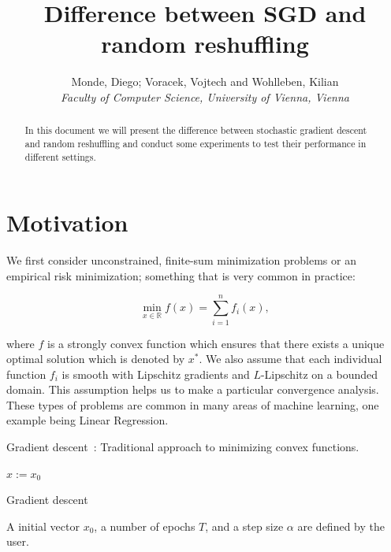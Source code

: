 \documentclass[10pt,conference,compsocconf]{IEEEtran}
\begin{document}
\title{Difference between SGD and random reshuffling}

\author{
  Monde, Diego; Voracek, Vojtech and Wohlleben, Kilian\\
  \textit{Faculty of Computer Science, University of Vienna, Vienna}
}

\maketitle

\begin{abstract}
In this document we will present the difference between stochastic gradient descent and random reshuffling and conduct some experiments to test their performance in different settings.
\end{abstract}

\section{Motivation}
\label{sec:motivation}
\medskip

We first consider unconstrained, finite-sum minimization problems or an
empirical risk minimization; something that is very common in practice:

\begin{equation}\label{eq:finite-sum}
\min_{x \in \mathbb{R}} f(x) = \sum_{i = 1}^n f_i(x),
\end{equation}


\noindent where $f$ is a strongly convex function which ensures that there
exists a unique optimal solution which is denoted by $x^*$. We also assume
that each individual function $f_i$ is smooth with Lipschitz gradients and
\mbox{$L$-Lipschitz} on a bounded domain. This assumption helps us to make
a particular convergence analysis.
These types of problems are common in many areas of machine learning, one example being Linear Regression.

\medskip

Gradient descent~\cite{GD}:
Traditional approach to minimizing convex functions.

\begin{algorithm}
\SetAlgoLined

  $x:= x_0$ \\
 
 \caption{Gradient descent}
\end{algorithm}
\noindent A initial vector $x_0$, a number of epochs $T$, and
a step size $\alpha$ are defined by the user.
\end{document}
